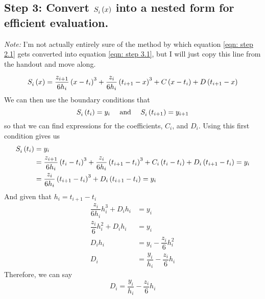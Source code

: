 \documentclass[letterpaper, 10pt, titlepage]{article}
\newcommand{\pp}{\paren}
\newcommand{\primed}[1]{^{
    \ifthenelse
    {
        \equal{#1}{0}
    }
    {
    }
    {
        \foreach \x in {1,...,#1}{\prime}}
    }
}
\newcommand{\fs}[3]{\functionof{S_{#1}\primed{#2}}{#3}}
\begin{document}
\subsection*{Step 3: Convert $\fs{i}{0}{x}$ into a nested form for efficient
evaluation.}
\begin{mdframed}
    \textit{Note:} I'm not actually entirely sure of the method by which
    equation \eqref{eqn: step 2.1} gets converted into equation
    \eqref{eqn: step 3.1}, but I will just copy this line from the handout
    and move along.
\end{mdframed}
\begin{equation}
    \fs{i}{0}{x} =
    \dfrac{z_{i+1}}{6h_i}\pp{x - t_i}^3
    + \dfrac{z_{i}}{6h_i}\pp{t_{i+1} - x}^3 + C\pp{x - t_i} + D\pp{t_{i+1} - x}
    \label{eqn: step 3.1}
\end{equation}
We can then use the boundary conditions that
\begin{equation}
    \fs{i}{0}{t_i} = y_i
    \quad\text{ and }\quad
    \fs{i}{0}{t_{i+1}} = y_{i+1}
\end{equation}
so that we can find expressions for the coefficients, $C_i$, and $D_i$.
Using this first condition gives us
\begin{equation}
    \begin{aligned}
        \fs{i}{0}{t_i} &= y_i
        \\
        &
        = \dfrac{z_{i+1}}{6h_i}\pp{t_i - t_i}^3
        + \dfrac{z_{i}}{6h_i}\pp{t_{i+1} - t_i}^3 + C_i\pp{t_i - t_i} +
        D_i\pp{t_{i+1} - t_i}
        = y_{i}
        \\
        &
        =
        \dfrac{z_{i}}{6h_i}\pp{t_{i+1} - t_i}^3
        + D_i\pp{t_{i+1} - t_i}
        = y_{i}
    \end{aligned}
\end{equation}
And given that $h_i = t_{i+1} - t_i$
\begin{equation}
    \begin{aligned}
        \dfrac{z_{i}}{6h_i}h_i^3
        + D_ih_i
        &= y_{i}
        \\
        \dfrac{z_{i}}{6}h_i^2
        + D_ih_i
        &= y_{i}
        \\
        D_ih_i
        &= y_{i}
        - \dfrac{z_{i}}{6}h_i^2
        \\
            D_i
            &= \dfrac{y_{i}}{h_i}
            - \dfrac{z_{i}}{6}h_i
    \end{aligned}
\end{equation}
Therefore, we can say
\begin{equation}
    \boxed{
        D_i
        = \dfrac{y_{i}}{h_i}
        - \dfrac{z_{i}}{6}h_i
    }
\end{equation}
\end{document}
